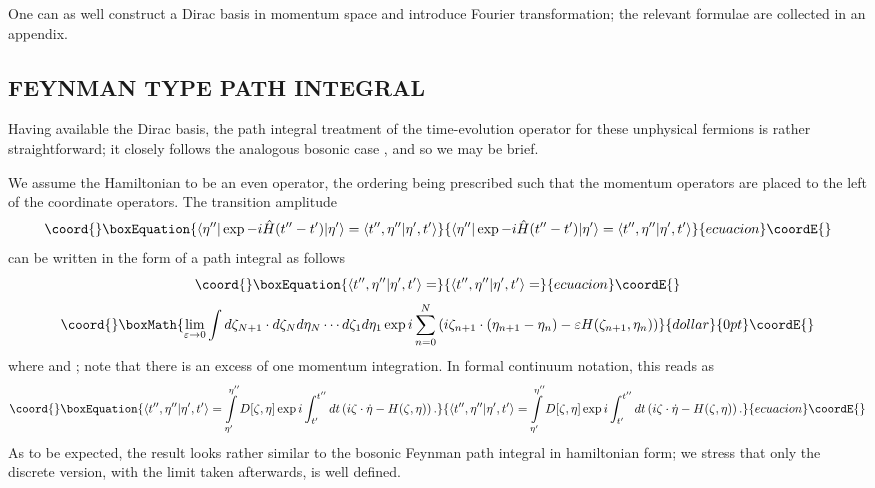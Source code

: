 \documentclass[a4paper,10pt]{article}
\begin{document}
One can as well construct a Dirac basis in momentum space and introduce Fourier 
transformation; the relevant formulae are collected in an appendix.


\subsection{FEYNMAN TYPE PATH INTEGRAL}

Having available the Dirac basis, the path integral treatment of the time-evolution 
operator for these unphysical fermions is rather straightforward; it closely follows the 
analogous bosonic case \cite{Fadd 76}, and so we may be brief.

We assume the Hamiltonian \coordHE{} to be an even operator, the 
ordering being prescribed such that the momentum operators are placed to the left of the 
coordinate operators. The transition amplitude
\begin{equation}\coord{}\boxEquation{
\langle\eta^{\prime\prime}|\exp-i\hat{H}(t^{\prime\prime}-
t^{\prime})|\eta^{\prime}\rangle=\langle t^{\prime\prime},\eta^{\prime\prime}|\eta^
{\prime},t^{\prime}\rangle
}{
\langle\eta^{\prime\prime}|\exp-i\hat{H}(t^{\prime\prime}-
t^{\prime})|\eta^{\prime}\rangle=\langle t^{\prime\prime},\eta^{\prime\prime}|\eta^
{\prime},t^{\prime}\rangle
}{ecuacion}\coordE{}\end{equation}
can be written in the form of a path integral as follows
\begin{equation}\coord{}\boxEquation{
\langle t^{\prime\prime},\eta^{\prime\prime}|\eta^
{\prime},t^{\prime}\rangle=
}{
\langle t^{\prime\prime},\eta^{\prime\prime}|\eta^
{\prime},t^{\prime}\rangle=
}{ecuacion}\coordE{}\end{equation}
$$\coord{}\boxMath{\lim_{\varepsilon \rightarrow 0}\int d\zeta_{N+1}\cdot d\zeta_Nd\eta_N\cdots 
d\zeta_1d\eta_1\exp i\sum\limits_{n=0}^{N}\left(i\zeta_{n+1}\cdot(\eta_{n+1}-\eta_n)-
\varepsilon H(\zeta_{n+1},\eta_n)\right)}{dollar}{0pt}\coordE{}$$
where \coordHE{} and \coordHE{}; note that there is an 
excess of one momentum integration. In formal continuum notation, this reads as
\begin{equation}\coord{}\boxEquation{\label{actionunphysicalrealfermions}
\langle t^{\prime\prime},\eta^{\prime\prime}|\eta^
{\prime},t^{\prime}\rangle=\int\limits_{\eta^{\prime}}^{\eta^{\prime\prime}}
D[\zeta,\eta]\exp i\int_{t^{\prime}}^{t^{\prime\prime}}dt\left(i\zeta\cdot\dot{\eta}-
H(\zeta,\eta)\right).
}{\langle t^{\prime\prime},\eta^{\prime\prime}|\eta^
{\prime},t^{\prime}\rangle=\int\limits_{\eta^{\prime}}^{\eta^{\prime\prime}}
D[\zeta,\eta]\exp i\int_{t^{\prime}}^{t^{\prime\prime}}dt\left(i\zeta\cdot\dot{\eta}-
H(\zeta,\eta)\right).
}{ecuacion}\coordE{}\end{equation}
As to be expected, the result looks rather similar to the bosonic Feynman path integral 
in hamiltonian form; we stress that only the discrete version, with the limit 
\coordHE{} taken afterwards, is well defined.
\end{document}

